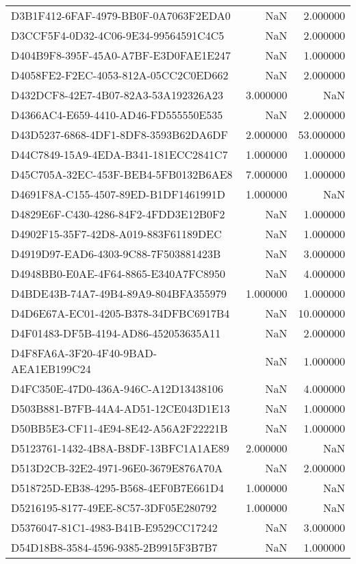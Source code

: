 \begin{tabular}{lrr}
D3B1F412-6FAF-4979-BB0F-0A7063F2EDA0 & NaN & 2.000000 \\
D3CCF5F4-0D32-4C06-9E34-99564591C4C5 & NaN & 2.000000 \\
D404B9F8-395F-45A0-A7BF-E3D0FAE1E247 & NaN & 1.000000 \\
D4058FE2-F2EC-4053-812A-05CC2C0ED662 & NaN & 2.000000 \\
D432DCF8-42E7-4B07-82A3-53A192326A23 & 3.000000 & NaN \\
D4366AC4-E659-4410-AD46-FD555550E535 & NaN & 2.000000 \\
D43D5237-6868-4DF1-8DF8-3593B62DA6DF & 2.000000 & 53.000000 \\
D44C7849-15A9-4EDA-B341-181ECC2841C7 & 1.000000 & 1.000000 \\
D45C705A-32EC-453F-BEB4-5FB0132B6AE8 & 7.000000 & 1.000000 \\
D4691F8A-C155-4507-89ED-B1DF1461991D & 1.000000 & NaN \\
D4829E6F-C430-4286-84F2-4FDD3E12B0F2 & NaN & 1.000000 \\
D4902F15-35F7-42D8-A019-883F61189DEC & NaN & 1.000000 \\
D4919D97-EAD6-4303-9C88-7F503881423B & NaN & 3.000000 \\
D4948BB0-E0AE-4F64-8865-E340A7FC8950 & NaN & 4.000000 \\
D4BDE43B-74A7-49B4-89A9-804BFA355979 & 1.000000 & 1.000000 \\
D4D6E67A-EC01-4205-B378-34DFBC6917B4 & NaN & 10.000000 \\
D4F01483-DF5B-4194-AD86-452053635A11 & NaN & 2.000000 \\
D4F8FA6A-3F20-4F40-9BAD-AEA1EB199C24 & NaN & 1.000000 \\
D4FC350E-47D0-436A-946C-A12D13438106 & NaN & 4.000000 \\
D503B881-B7FB-44A4-AD51-12CE043D1E13 & NaN & 1.000000 \\
D50BB5E3-CF11-4E94-8E42-A56A2F22221B & NaN & 1.000000 \\
D5123761-1432-4B8A-B8DF-13BFC1A1AE89 & 2.000000 & NaN \\
D513D2CB-32E2-4971-96E0-3679E876A70A & NaN & 2.000000 \\
D518725D-EB38-4295-B568-4EF0B7E661D4 & 1.000000 & NaN \\
D5216195-8177-49EE-8C57-3DF05E280792 & 1.000000 & NaN \\
D5376047-81C1-4983-B41B-E9529CC17242 & NaN & 3.000000 \\
D54D18B8-3584-4596-9385-2B9915F3B7B7 & NaN & 1.000000 \\

\end{tabular}
